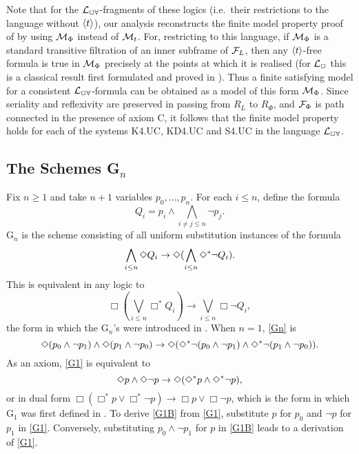 Note that for the ${\cal L}_{\Box\forall}$-fragments of these logics (i.e.\ their restrictions to the language without ${\langle t\rangle}$), our analysis reconstructs the finite model property proof of \cite{Sheh:everywhere99} by using $\mathcal{M}_\Phi$ instead of $\mathcal{M}_t$. For, restricting to this language, if $\mathcal{M}_\Phi$ is a standard transitive filtration of an inner subframe of $\mathcal{F}_L$, then any ${\langle t\rangle}$-free formula is true in $\mathcal{M}_\Phi$ precisely at the points at which it is realised (for ${\cal L}_{\Box}$ this is a classical result first formulated and proved in \cite{sege:deci68}). Thus a finite satisfying model for a consistent 
${\cal L}_{\Box\forall}$-formula can be obtained as a model of this form $\mathcal{M}_\Phi$. Since seriality and reflexivity are preserved in passing from $R_L$ to $R_\Phi$, and $\mathcal{F}_\Phi$ is path connected in the presence of  axiom C, it follows that the finite model property holds for each of the systems K4.UC, KD4.UC and S4.UC in the language 
${\cal L}_{\Box\forall}$.



\subsection{The Schemes G$_n$}

Fix $n\geq 1$ and take $n+1$ variables $p_0,\dots,p_{n}$. For each $i\leq n$, define the formula
\begin{equation} \label{Qi}
Q_i=p_i \land  \bigwedge_{i\ne j\leq n}\neg p_j.
\end{equation}
G$_n$ is the scheme consisting of all uniform substitution instances of the formula
\begin{equation} \label{Gn}
\bigwedge_{i\leq n}\Dim Q_i\to\Dim(\bigwedge_{i\leq n}\Dim^* \neg Q_i ).
\end{equation}
This is equivalent in any  logic to
\begin{equation*}
\Box(\bigvee_{i\leq n}\Box^*  Q_i )\to \bigvee_{i\leq n}\Box\neg Q_i,
\end{equation*}
the form in which the G$_n$'s were introduced in \cite{Sheh:d90}. When $n=1$, \eqref{Gn} is
\begin{equation}  \label{G1}
\Dim(p_0\land\neg p_1)\land \Dim(p_1\land\neg p_0) \to \Dim(\Dim^*\neg(p_0\land\neg p_1)\land \Dim^*\neg(p_1\land\neg p_0)).
\end{equation}
As an axiom, \eqref{G1} is equivalent  to
\begin{equation}  \label{G1B}
\Dim p\land \Dim\neg p \to \Dim(\Dim^* p\land \Dim^*\neg p),
\end{equation}
or in dual form $\Box(\Box^* p\lor \Box^* \neg p)\to \Box p\lor \Box \neg p$, which is the form in which G$_1$ was first defined in \cite{Sheh:d90}. To derive \eqref{G1B} from \eqref{G1}, substitute $p$ for $p_0$ and $\neg p$ for $p_1$ in \eqref{G1}. Conversely, substituting $p_0\land\neg p_1$ for $p$ 
in  \eqref{G1B} leads to a derivation of  \eqref{G1}.

